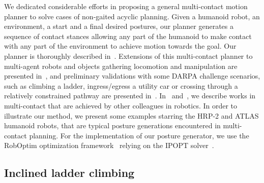We dedicated considerable efforts in proposing a general multi-contact motion planner to solve cases of non-gaited acyclic planning. Given a humanoid robot, an environment, a start and a final desired postures, our planner generates a sequence of contact stances allowing any part of the humanoid to make contact with any part of the environment to achieve motion towards the goal. Our planner is thoroughly described in~\cite{escande:ras:2013}. Extensions of this multi-contact planner to multi-agent robots and objects gathering locomotion and manipulation are presented in~\cite{bouyarmane:ar:2012}, and preliminary validations with some DARPA challenge scenarios, such as climbing a ladder, ingress/egress a utility car or crossing through a relatively constrained pathway are presented in~\cite{bouyarmane:humanoids:2012}. In~\cite{escande:ras:2013} and~\cite{bouyarmane:ar:2012}, we describe works in multi-contact that are achieved by other colleagues in robotics. 
In order to illustrate our method, we present some examples starring the HRP-2 and ATLAS humanoid robots, that are typical posture generations encountered in multi-contact planning.
For the implementation of our posture generator, we use the RobOptim optimization framework~\cite{moulard:jsme:2013}{} relying on the IPOPT solver~\cite{wachter:mp:2006}{}.

\subsection{Inclined ladder climbing}
\label{subsec:Inclined ladder Climbing}

